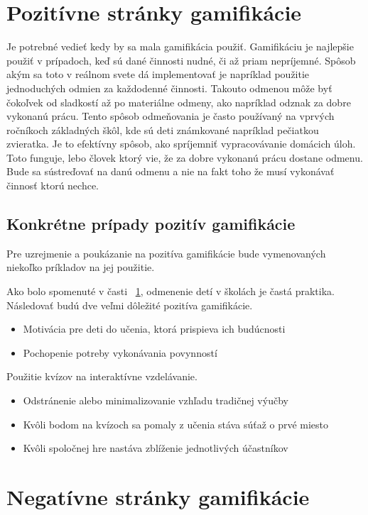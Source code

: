 \documentclass[10pt,oneside,slovak,a4paper]{article}
\begin{document}
\section{Pozitívne stránky gamifikácie} \label{PozitivnaGamifikacia}

Je potrebné vedieť kedy by sa mala gamifikácia použiť. Gamifikáciu je najlepšie použiť v prípadoch, keď sú dané činnosti nudné, či až priam nepríjemné. Spôsob akým sa toto v reálnom svete dá implementovať je napríklad použitie jednoduchých odmien za každodenné činnosti. Takouto odmenou môže byť čokoľvek od sladkostí až po materiálne odmeny, ako napríklad odznak za dobre vykonanú prácu. Tento spôsob odmeňovania je často používaný na vprvých ročníkoch základných škôl, kde sú deti známkované napríklad pečiatkou zvieratka. Je to efektívny spôsob, ako spríjemniť vypracovávanie domácich úloh. Toto funguje, lebo človek ktorý vie, že za dobre vykonanú prácu dostane odmenu. Bude sa sústreďovať na danú odmenu a nie na fakt toho že musí vykonávať činnosť ktorú nechce.

\subsection{Konkrétne prípady pozitív gamifikácie} \label{PozitivnaPriklady}
Pre uzrejmenie a poukázanie na pozitíva gamifikácie bude vymenovaných niekoľko príkladov na jej použitie.

Ako bolo spomenuté v časti ~\ref{PozitivnaGamifikacia}, odmenenie detí v školách je častá praktika. Následovať budú dve veľmi dôležité pozitíva gamifikácie.
\begin{itemize}
\item Motivácia pre deti do učenia, ktorá prispieva ich budúcnosti
\item Pochopenie potreby vykonávania povynností
\end{itemize}
Použitie kvízov na interaktívne vzdelávanie.
\begin{itemize}
\item Odstránenie alebo minimalizovanie vzhľadu tradičnej výučby
\item Kvôli bodom na kvízoch sa pomaly z učenia stáva súťaž o prvé miesto
\item Kvôli spoločnej hre nastáva zblíženie jednotlivých účastníkov
\end{itemize}



\section{Negatívne stránky gamifikácie} \label{NegativnaGamifikacia}
\end{document}
